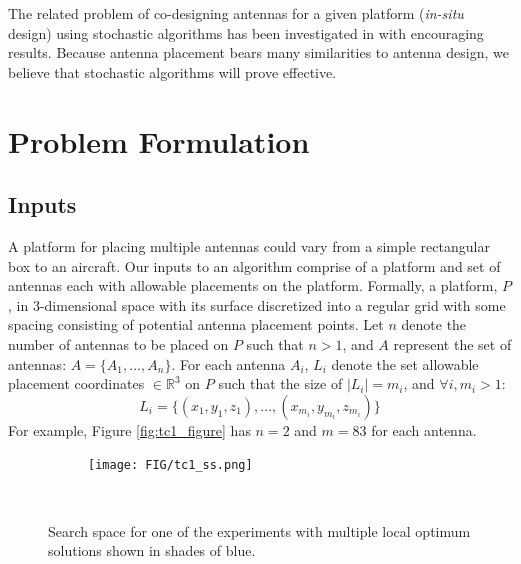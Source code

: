 \documentclass[conference]{IEEEtran}
\begin{document}
The related problem of co-designing antennas for a given platform ({\em in-situ} design) using stochastic algorithms has been investigated in \cite{linden2000wire} with encouraging results. Because antenna placement bears many similarities to antenna design, we believe that stochastic algorithms will prove effective.

\section{Problem Formulation}
\label{sec:problem}
\subsection{Inputs}
\label{sec:inputs}
A platform for placing multiple antennas could vary from a simple rectangular box to an aircraft. Our inputs to an algorithm comprise of a platform and set of antennas each with allowable placements on the platform. Formally, a platform, $P$, in 3-dimensional space with its surface discretized into a regular grid with some spacing consisting of potential antenna placement points. Let $n$ denote the number of antennas to be placed on $P$ such that $n>1$, and $A$ represent the set of antennas: $A = \{A_1, ..., A_n\}$. For each antenna $A_i$, $L_i$ denote the set allowable placement coordinates $\in \mathbb R^3$ on $P$ such that the size of $\mid L_i \mid =m_i$, and $ \forall i, m_i>1$:
\[
L_i = \{(x_{1}, y_{1}, z_{1}), ..., (x_{m_i}, y_{m_i}, z_{m_i})\}
\]
For example, Figure \ref{fig:tc1_figure} has $n=2$ and $m=83$ for each antenna.
\begin{figure}%
    \begin{subfigure}{\columnwidth}
        \texttt{[image: FIG/tc1\_ss.png]}%
    \end{subfigure}\hfill\\
    \caption{Search space for one of the experiments with multiple local optimum solutions shown in shades of blue.}%
    \label{fig:tc1_ss}%
\end{figure}
\end{document}

